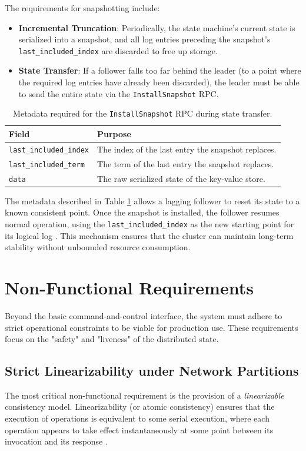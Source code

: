 The requirements for snapshotting include:
\begin{itemize}
    \item \textbf{Incremental Truncation}: Periodically, the state machine's current state is serialized into a snapshot, and all log entries preceding the snapshot's \texttt{last\_included\_index} are discarded to free up storage.
    \item \textbf{State Transfer}: If a follower falls too far behind the leader (to a point where the required log entries have already been discarded), the leader must be able to send the entire state via the \texttt{InstallSnapshot} RPC.
\end{itemize}

\begin{table}[h]
\centering
\caption{Metadata required for the \texttt{InstallSnapshot} RPC during state transfer.}
\label{tab:snapshot_metadata}
\begin{tabular}{|l|p{8cm}|}
\hline
\textbf{Field} & \textbf{Purpose} \\ \hline
\texttt{last\_included\_index} & The index of the last entry the snapshot replaces. \\ \hline
\texttt{last\_included\_term} & The term of the last entry the snapshot replaces. \\ \hline
\texttt{data} & The raw serialized state of the key-value store. \\ \hline
\end{tabular}
\end{table}

The metadata described in Table \ref{tab:snapshot_metadata} allows a lagging follower to reset its state to a known consistent point. Once the snapshot is installed, the follower resumes normal operation, using the \texttt{last\_included\_index} as the new starting point for its logical log \cite{Raft2014}. This mechanism ensures that the cluster can maintain long-term stability without unbounded resource consumption.

\section{Non-Functional Requirements}
Beyond the basic command-and-control interface, the system must adhere to strict operational constraints to be viable for production use. These requirements focus on the "safety" and "liveness" of the distributed state.

\subsection{Strict Linearizability under Network Partitions}
The most critical non-functional requirement is the provision of a \textit{linearizable} consistency model. Linearizability (or atomic consistency) ensures that the execution of operations is equivalent to some serial execution, where each operation appears to take effect instantaneously at some point between its invocation and its response \cite{Linearizability1990}.

